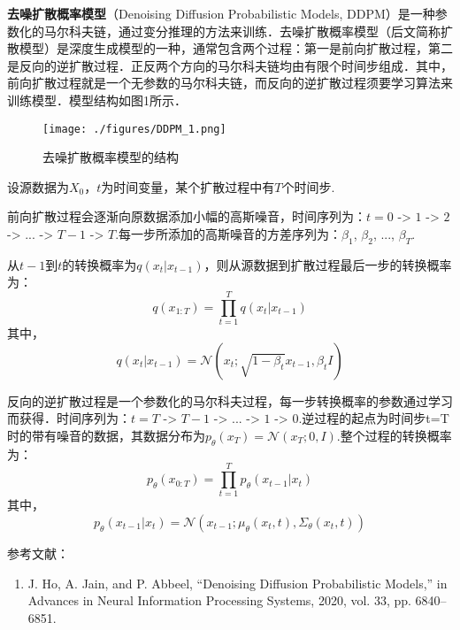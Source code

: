 
\textbf{去噪扩散概率模型}（Denoising Diffusion Probabilistic Models, DDPM）是一种参数化的马尔科夫链，通过变分推理的方法来训练．去噪扩散概率模型（后文简称扩散模型）是深度生成模型的一种，通常包含两个过程：第一是前向扩散过程，第二是反向的逆扩散过程．正反两个方向的马尔科夫链均由有限个时间步组成．其中，前向扩散过程就是一个无参数的马尔科夫链，而反向的逆扩散过程须要学习算法来训练模型．模型结构如图1所示．
\begin{figure}[ht]
\centering
\texttt{[image: ./figures/DDPM\_1.png]}
\caption{去噪扩散概率模型的结构} \label{DDPM_fig1}
\end{figure}

设源数据为$X_0$，$t$为时间变量，某个扩散过程中有$T$个时间步.

前向扩散过程会逐渐向原数据添加小幅的高斯噪音，时间序列为：$t=0$ -> $1$ -> $2$ -> ... -> $T-1$ -> $T$.每一步所添加的高斯噪音的方差序列为：$\beta_1$, $\beta_2$, ..., $\beta_T$.

从$t-1$到$t$的转换概率为$q(x_t|x_{t-1})$，则从源数据到扩散过程最后一步的转换概率为：
\begin{equation}
q(x_{1:T})=\prod_{t=1}^{T}q(x_{t}|x_{t-1})
\end{equation}
其中，
\begin{equation}
q(x_{t}|x_{t-1})=\mathcal{N}(x_t;\sqrt{1-\beta_t}x_{t-1},\beta_tI)
\end{equation}

反向的逆扩散过程是一个参数化的马尔科夫过程，每一步转换概率的参数通过学习而获得．时间序列为：$t=T$ -> $T-1$ -> ... -> $1$ -> $0$.逆过程的起点为时间步t=T时的带有噪音的数据，其数据分布为$p_\theta(x_T)=\mathcal{N}(x_T;0,I)$.整个过程的转换概率为：
\begin{equation}
p_{\theta}(x_{0:T})=\prod_{t=1}^{T}p_{\theta}(x_{t-1}|x_{t})
\end{equation}
其中，
\begin{equation}
p_{\theta}(x_{t-1}|x_{t})=\mathcal{N}(x_{t-1};\mu_\theta(x_{t},t),\Sigma_\theta(x_t,t))
\end{equation}


参考文献：
\begin{enumerate}
\item J. Ho, A. Jain, and P. Abbeel, “Denoising Diffusion Probabilistic Models,” in Advances in Neural Information Processing Systems, 2020, vol. 33, pp. 6840–6851.
\end{enumerate}